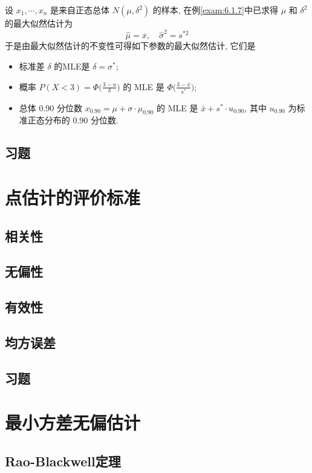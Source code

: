 \begin{example}
设 $x_1,\cdots,x_n$ 是来自正态总体 $N(\mu,\delta^2)$ 的样本, 在例\ref{exam:6.1.7}中已求得 $\mu$ 和 $\delta^2$ 的最大似然估计为
\[\hat{\mu}=\overline{x},\quad\hat{\sigma}^{2}=s^{*2}\]
于是由最大似然估计的不变性可得如下参数的最大似然估计, 它们是
\begin{itemize}
\item 标准差 $\delta$ 的MLE是 $\delta=\sigma^*$;
\item 概率 $P(X<3)=\Phi\big(\frac{3-u}{\delta}\big)$ 的 MLE 是 $\Phi\big(\frac{3-\bar{x}}{s^*}\big)$;
\item 总体 0.90 分位数 $x_{0.90}=\mu+\sigma\cdot\mu_{0.90}$ 的 MLE 是 $\bar{x}+s^{*}\cdot u_{0.90}$, 其中 $u_{0.90}$ 为标准正态分布的 0.90 分位数.
\end{itemize}
\end{example}

\subsection{习题\label{ssec:6.1}}

\section{点估计的评价标准}
\subsection{相关性}
\subsection{无偏性}
\subsection{有效性}
\subsection{均方误差}
\subsection{习题}

\section{最小方差无偏估计}
\subsection{Rao-Blackwell定理}
